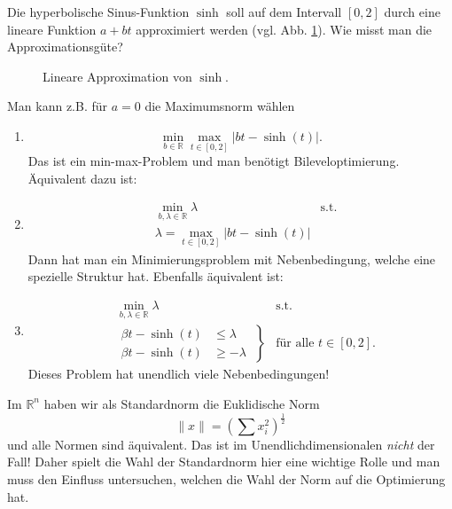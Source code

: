 \documentclass[main.tex]{subfiles}
\begin{document}
\begin{bsp}\label{1.4}
Die hyperbolische Sinus-Funktion $\sinh$ soll auf dem Intervall $[0,2]$ durch eine lineare Funktion $a+bt$ approximiert werden (vgl. Abb. \ref{fig:1.4}). Wie misst man die Approximationsgüte?\\
\begin{figure}[h!]
    \centering
    
    \caption{Lineare Approximation von $\sinh$.}\label{fig:1.4}
\end{figure}
Man kann z.B. für $a=0$ die Maximumsnorm wählen
\begin{enumerate}[label=\alph*)]
    \item $$\min_{ b\in ℝ}\max_{t\in [0,2]} | bt - \sinh(t) |.$$
    Das ist ein min-max-Problem und man benötigt Bileveloptimierung.
    Äquivalent dazu ist:
    \item \begin{align*}
        &\min_{b, λ\in ℝ} λ&\text{s.t.}\\
        &λ = \max_{t\in [0,2]} |bt - \sinh(t) |
        \end{align*}
    Dann hat man ein Minimierungsproblem mit Nebenbedingung, welche eine spezielle Struktur hat. Ebenfalls äquivalent ist:
    \item 
    \begin{align*}
        &\min_{b,λ\in ℝ}λ&\text{s.t.}\\
        &\left. \begin{aligned}
        βt - \sinh (t) &\le λ \\
        βt - \sinh(t) &\ge -λ
        \end{aligned}\; \right\} &\text{für alle $t \in [0,2]$}. 
    \end{align*}
    Dieses Problem hat unendlich viele Nebenbedingungen!
\end{enumerate}
\end{bsp}

\begin{bem*}
Im $ℝ^n$ haben wir als Standardnorm die Euklidische Norm
$$\|x\| = \left( \sum x_i^2 \right)^{\frac{1}{2}}$$
und alle Normen sind äquivalent. Das ist im Unendlichdimensionalen \emph{nicht} der Fall! Daher spielt die Wahl der Standardnorm hier eine wichtige Rolle und man muss den Einfluss untersuchen, welchen die Wahl der Norm auf die Optimierung hat.
\end{bem*}
\end{document}
